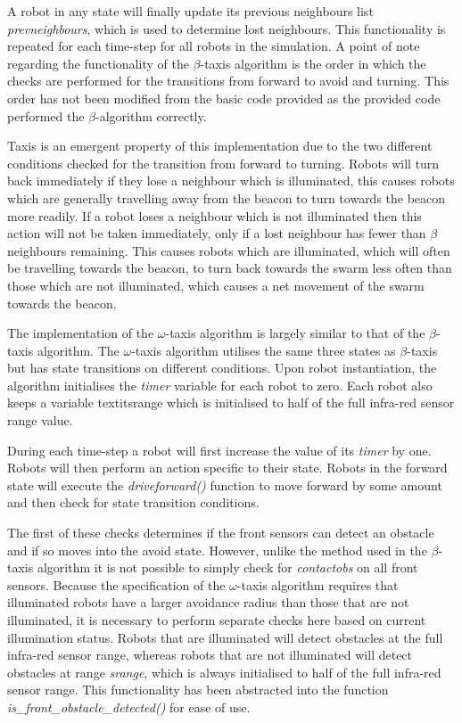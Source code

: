 \documentclass[conference]{IEEEtran}
\begin{document}
A robot in any state will finally update its previous neighbours list \textit{prevneighbours}, which is used to determine lost neighbours. This functionality is repeated for each time-step for all robots in the simulation. A point of note regarding the functionality of the $\beta$-taxis algorithm is the order in which the checks are performed for the transitions from forward to avoid and turning. This order has not been modified from the basic code provided as the provided code performed the $\beta$-algorithm correctly.

Taxis is an emergent property of this implementation due to the two different conditions checked for the transition from forward to turning. Robots will turn back immediately if they lose a neighbour which is illuminated, this causes robots which are generally travelling away from the beacon to turn towards the beacon more readily. If a robot loses a neighbour which is not illuminated then this action will not be taken immediately, only if a lost neighbour has fewer than $\beta$ neighbours remaining. This causes robots which are illuminated, which will often be travelling towards the beacon, to turn back towards the swarm less often than those which are not illuminated, which causes a net movement of the swarm towards the beacon. 

The implementation of the $\omega$-taxis algorithm is largely similar to that of the $\beta$-taxis algorithm. The $\omega$-taxis algorithm utilises the same three states as $\beta$-taxis but has state transitions on different conditions. Upon robot instantiation, the algorithm initialises the \textit{timer} variable for each robot to zero. Each robot also keeps a variable textit{srange} which is initialised to half of the full infra-red sensor range value.

During each time-step a robot will first increase the value of its \textit{timer} by one. Robots will then perform an action specific to their state. Robots in the forward state will execute the \textit{driveforward()} function to move forward by some amount and then check for state transition conditions.

The first of these checks determines if the front sensors can detect an obstacle and if so moves into the avoid state. However, unlike the method used in the $\beta$-taxis algorithm it is not possible to simply check for \textit{contactobs} on all front sensors. Because the specification of the $\omega$-taxis algorithm requires that illuminated robots have a larger avoidance radius than those that are not illuminated, it is necessary to perform separate checks here based on current illumination status. Robots that are illuminated will detect obstacles at the full infra-red sensor range, whereas robots that are not illuminated will detect obstacles at range \textit{srange}, which is always initialised to half of the full infra-red sensor range. This functionality has been abstracted into the function \textit{is\_front\_obstacle\_detected()} for ease of use. 
\end{document}
